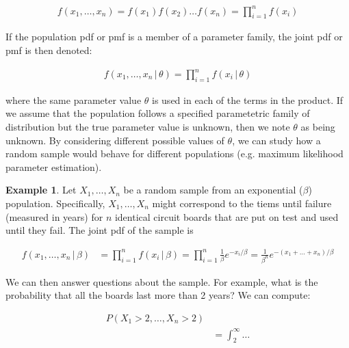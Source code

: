 \documentclass[11pt,a4paper]{report}
\theoremstyle{definition}
\theoremstyle{theorem}
\theoremstyle{example}
\newtheorem{ex}{Example}[section]
\begin{document}
\begin{align*}
  f(x_1, \dots, x_n) = f(x_1)f(x_2) \dots f(x_n) = \prod_{i=1}^n f(x_i)
\end{align*}

If the population pdf or pmf is a member of a parameter family, the joint pdf or pmf is then denoted:

\begin{align*}
  f(x_1, \dots, x_n \, | \, \theta) = \prod_{i=1}^n f(x_i \, | \, \theta)
\end{align*}

where the same parameter value $\theta$ is used in each of the terms in the product.  If we assume that the population follows a specified parametetric family of distribution but the true parameter value is unknown, then we note $\theta$ as being unknown.  By considering different possible values of $\theta$, we can study how a random sample would behave for different populations (e.g. maximum likelihood parameter estimation).

\begin{ex}
  Let $X_1, \dots, X_n$ be a random sample from an exponential ($\beta$) population.  Specifically, $X_1, \dots, X_n$ might correspond to the tiems until failure (measured in years) for $n$ identical circuit boards that are put on test and used until they fail.  The joint pdf of the sample is

  \begin{align*}
    f(x_1, \dots, x_n \, | \, \beta) &= \prod_{i=1}^n f(x_i \, | \, \beta) = \prod_{i=1}^n \frac{1}{\beta} e^{-x_i / \beta} = \frac{1}{\beta^n}e^{-(x_1 + \dots + x_n)/\beta}
  \end{align*}

  We can then answer questions about the sample.  For example, what is the probability that all the boards last more than 2 years?  We can compute:

  \begin{align*}
    P(X_1 > 2, \dots, X_n > 2) &\\
    &= \int_2^{\infty} \dots 
  \end{align*}
\end{ex}
\end{document}
